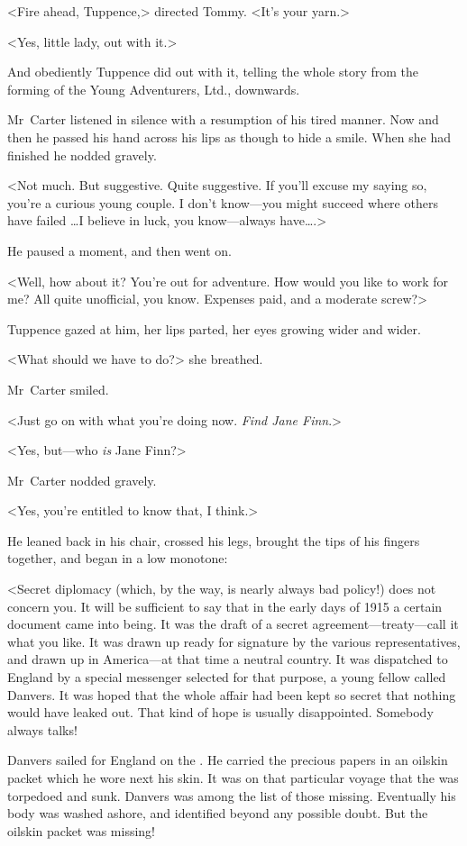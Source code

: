 <Fire ahead, Tuppence,> directed Tommy. <It's your yarn.>

<Yes, little lady, out with it.>

And obediently Tuppence did out with it, telling the whole story from the forming of the Young Adventurers, Ltd., downwards.

Mr~Carter listened in silence with a resumption of his tired manner. Now and then he passed his hand across his lips as though to hide a smile. When she had finished he nodded gravely.

<Not much. But suggestive. Quite suggestive. If you'll excuse my saying so, you're a curious young couple. I don't know—you might succeed where others have failed \dots I believe in luck, you know—always have\dots.>

He paused a moment, and then went on.

<Well, how about it? You're out for adventure. How would you like to work for me? All quite unofficial, you know. Expenses paid, and a moderate screw?>

Tuppence gazed at him, her lips parted, her eyes growing wider and wider.

<What should we have to do?> she breathed.

Mr~Carter smiled.

<Just go on with what you're doing now. \emph{Find Jane Finn}.>

<Yes, but—who \emph{is} Jane Finn?>

Mr~Carter nodded gravely.

<Yes, you're entitled to know that, I think.>

He leaned back in his chair, crossed his legs, brought the tips of his fingers together, and began in a low monotone:

<Secret diplomacy (which, by the way, is nearly always bad policy!) does not concern you. It will be sufficient to say that in the early days of 1915 a certain document came into being. It was the draft of a secret agreement—treaty—call it what you like. It was drawn up ready for signature by the various representatives, and drawn up in America—at that time a neutral country. It was dispatched to England by a special messenger selected for that purpose, a young fellow called Danvers. It was hoped that the whole affair had been kept so secret that nothing would have leaked out. That kind of hope is usually disappointed. Somebody always talks!

Danvers sailed for England on the . He carried the precious papers in an oilskin packet which he wore next his skin. It was on that particular voyage that the  was torpedoed and sunk. Danvers was among the list of those missing. Eventually his body was washed ashore, and identified beyond any possible doubt. But the oilskin packet was missing!

